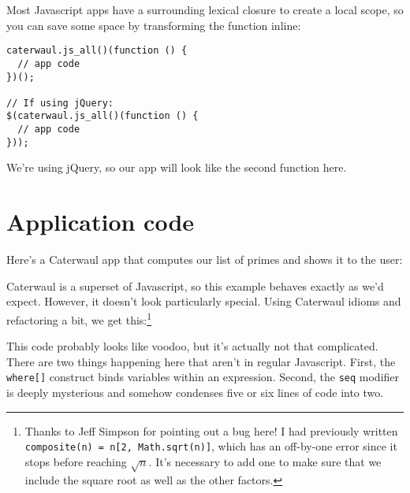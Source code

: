 \documentclass{report}
\begin{document}
    Most Javascript apps have a surrounding lexical closure to create a local scope, so you can save some space by transforming the function inline:

\begin{verbatim}
caterwaul.js_all()(function () {
  // app code
})();

// If using jQuery:
$(caterwaul.js_all()(function () {
  // app code
}));
\end{verbatim}

    We're using jQuery, so our app will look like the second function here.

\section{Application code}
    Here's a Caterwaul app that computes our list of primes and shows it to the user:


    Caterwaul is a superset of Javascript, so this example behaves exactly as we'd expect. However, it doesn't look particularly special. Using Caterwaul idioms and refactoring a bit, we get
    this:\footnote{Thanks to Jeff Simpson for pointing out a bug here! I had previously written {\tt composite(n) = n[2, Math.sqrt(n)]}, which has an off-by-one error since it stops before
    reaching $\sqrt n$. It's necessary to add one to make sure that we include the square root as well as the other factors.}


    This code probably looks like voodoo, but it's actually not that complicated. There are two things happening here that aren't in regular Javascript. First, the {\tt where[]} construct
    binds variables within an expression. Second, the {\tt seq} modifier is deeply mysterious and somehow condenses five or six lines of code into two.
\end{document}
